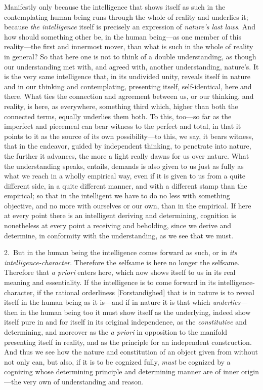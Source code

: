 \documentclass[12pt,a4paper]{book}
\begin{document}
Manifestly only because the intelligence that shows itself as such in the
contemplating human being runs through the whole of reality and underlies it;
because \emph{the intelligence} itself is precisely an expression of \emph{nature's
last laws}. And how should something other be, in the human being---as one
member of this reality---the first and innermost mover, than what is such in the
whole of reality in general? So that here one is not to think of a double
understanding, as though our understanding met with, and agreed with, another
understanding, nature's. It is the very same intelligence that, in its undivided
unity, reveals itself in nature and in our thinking and contemplating, presenting
itself, self-identical, here and there. What ties the connection and agreement
between us, or our thinking, and reality, is here, as everywhere, something third
which, higher than both the connected terms, equally underlies them both. To
this, too---so far as the imperfect and piecemeal can bear witness to the perfect
and total, in that it points to it as the source of its own possibility---to
this, we say, it bears witness, that in the endeavor, guided by independent
thinking, to penetrate into nature, the further it advances, the more a light
really dawns for us over nature. What the understanding speaks, entails, demands
is also given to us just as fully as what we reach in a wholly empirical way, even
if it is given to us from a quite different side, in a quite different manner, and
with a different stamp than the empirical; so that in the intelligent we have to do
no less with something objective, and no more with ourselves or our own, than in
the empirical. If here at every point there is an intelligent deriving and
determining, cognition is nonetheless at every point a receiving and beholding,
since we derive and determine, in conformity with the understanding, as we see
that we must.

2.~But in the human being the intelligence comes forward as such, or in \emph{its
intelligence-character}. Therefore the selfsame is here no longer the selfsame.
Therefore that \emph{a priori} enters here, which now shows itself to us in its
real meaning and essentiality. If the intelligence is to come forward in its
intelligence-character, if the rational orderliness [Forstandighed] that is in
nature is to reveal itself in the human being as it is---and if in nature it is
that which \emph{underlies}---then in the human being too it must show itself as
the underlying, indeed show itself pure in and for itself in its original
independence, as the \emph{constitutive} and determining, and moreover as the
\emph{a priori} in opposition to the manifold presenting itself in reality, and as
the principle for an independent construction. And thus we see how the nature and
constitution of an object given from without not only can, but also, if it is to
be cognized fully, \emph{must} be cognized by a cognizing whose determining principle and
determining manner are of inner origin---the very own of understanding and reason.
\end{document}
